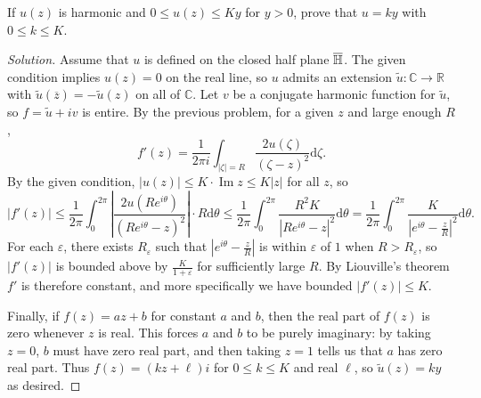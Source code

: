 \documentclass[10pt]{article}
\providecommand{\ol}{\overline}
\newcommand{\dd}{\mathrm{d}}
\providecommand{\eps}{\varepsilon}
\providecommand{\CC}{\mathbb C}
\providecommand{\RR}{\mathbb R}
\newenvironment{soln}{\begin{proof}[Solution]}{\end{proof}}
\providecommand{\abs}[1]{\left\lvert #1\right\rvert}
\begin{document}
\begin{problem}
    [p.174\#5]
    If $u(z)$ is harmonic and $0\le u(z)\le Ky$ for $y > 0$,
    prove that $u = ky$ with $0\le k\le K$.
\end{problem}

\begin{soln}
    Assume that $u$ is defined on the closed half plane $\ol\HH$.
    The given condition implies $u(z) = 0$ on the real line,
    so $u$ admits an extension $\tilde u\colon\CC\to\RR$
    with $\tilde u(\ol z) = -\tilde u(z)$ on all of $\CC$.
    Let $v$ be a conjugate harmonic function for $\tilde u$,
    so $f = \tilde u + iv$ is entire. By the previous problem,
    for a given $z$ and large enough $R$,
    \begin{equation*}
	f'(z) = \frac 1{2\pi i}\int_{\abs\zeta = R}
	\frac{2u(\zeta)}{(\zeta-z)^2}\dd\zeta.
    \end{equation*}
    By the given condition,
    $\abs{u(z)} \le K\cdot\operatorname{Im}z \le K\abs z$ for all $z$, so
    \begin{equation*}
	\abs{f'(z)} \le \frac 1{2\pi}\int_0^{2\pi}
	\abs{\frac{2u(Re^{i\theta})}{(Re^{i\theta} - z)^2}}\cdot R\dd\theta
	\le \frac 1{2\pi}\int_0^{2\pi}
	\frac{R^2K}{\abs{Re^{i\theta} - z}^2}\dd\theta
	= \frac 1{2\pi}\int_0^{2\pi}
	\frac{K}{\abs{e^{i\theta} - \frac zR}^2}\dd\theta.
    \end{equation*}
    For each $\eps$, there exists $R_\eps$ such that
    $\abs{e^{i\theta} - \frac zR}$ is within $\eps$ of $1$
    when $R > R_\eps$, so $\abs{f'(z)}$ is bounded above by $\frac K{1+\eps}$
    for sufficiently large $R$. By Liouville's theorem
    $f'$ is therefore constant, and more specifically we have bounded
    $\abs{f'(z)} \le K$.

    Finally, if $f(z) = az + b$ for constant $a$ and $b$,
    then the real part of $f(z)$ is zero whenever $z$ is real.
    This forces $a$ and $b$ to be purely imaginary:
    by taking $z = 0$, $b$ must have zero real part,
    and then taking $z = 1$ tells us that $a$ has zero real part.
    Thus $f(z) = (kz + \ell)i$ for $0\le k \le K$ and real $\ell$,
    so $\tilde u(z) = ky$ as desired.
\end{soln}
\end{document}
